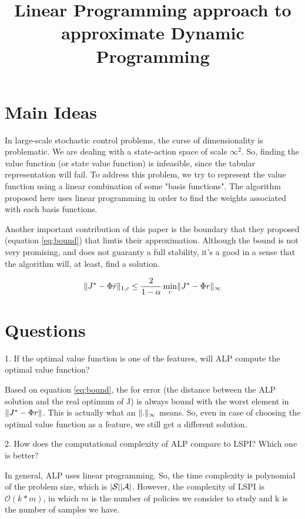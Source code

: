 \documentclass{article}
\title{Linear Programming approach to approximate Dynamic Programming}
\date{}
\theoremstyle{remark}
\theoremstyle{remark}
\theoremstyle{remark}
\theoremstyle{remark}
\theoremstyle{remark}
\theoremstyle{remark}
\DeclarePairedDelimiter{\norm}{\lVert}{\rVert}
\DeclarePairedDelimiter\abs{\lvert}{\rvert}%
\begin{document}
\maketitle
\section{Main Ideas}

In large-scale stochastic control problems, the curse of dimensionality is problematic. We are dealing with a state-action space of scale $\infty^2$. So, finding the value function (or state value function) is infeasible, since the tabular representation will fail. To address this problem, we try to represent the value function using a linear combination of some "basis functions". The algorithm proposed here uses linear programming in order to find the weights associated with each basis functions.

Another important contribution of this paper is the boundary that they proposed (equation \ref{eq:bound}) that limtis their approximation. Although the bound is not very promising, and does not guaranty a full stability, it's a good in a sense that the algorithm will, at least, find a solution.

\begin{equation}
\label{eq:bound}
\norm{J^* - \Phi \bar{r}}_{1,c}  \leq \frac{2}{1 - \alpha} \min_r \norm{J^* - \Phi {r}}_{\infty}
\end{equation}

\section{Questions}

1. If the optimal value function is one of the features, will ALP compute the optimal value function?

Based on equation \ref{eq:bound}, the for error (the distance between the ALP solution and the real optimum of J) is always bound with the worst element in $\norm{J^* - \Phi {r}}$. This is actually what an $\norm{.}_\infty$ means. So, even in case of choosing the optimal value function as a feature, we still get a different solution.

2. How does the computational complexity of ALP compare to LSPI? Which one is better?

In general, ALP uses linear programming. So, the time complexity is polynomial of the problem size, which is $ \abs{\mathcal{S}}\abs{\mathcal{A}} $. However, the complexity of LSPI is $ \mathcal{O}(k*m) $, in which $m$ is the number of policies we consider to study and k is the number of samples we have.
\end{document}
